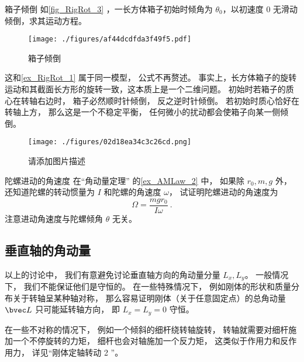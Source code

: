 \begin{example}{箱子倾倒}
如\autoref{fig_RigRot_3} ，一长方体箱子初始时倾角为 $\theta_0$，以初速度 0 无滑动倾倒，求其运动方程。
\begin{figure}[ht]
\centering
\texttt{[image: ./figures/af44dcdfda3f49f5.pdf]}
\caption{箱子倾倒} \label{fig_RigRot_3}
\end{figure}
这和\autoref{ex_RigRot_1} 属于同一模型， 公式不再赘述。 事实上，长方体箱子的旋转运动和其截面长方形的旋转一致，这本质上是一个二维问题。 初始时若箱子的质心在转轴右边时， 箱子必然顺时针倾倒， 反之逆时针倾倒。 若初始时质心恰好在转轴上方， 那么这是一个不稳定平衡， 任何微小的扰动都会使箱子向某一侧倾倒。
\end{example}

\begin{example}{}\label{ex_RigRot_2}
\begin{figure}[ht]
\centering
\texttt{[image: ./figures/02d18ea34c3c26cd.png]}
\caption{请添加图片描述} \label{fig_RigRot_4}
\end{figure}
\end{example}

\begin{exercise}{陀螺进动的角速度}\label{exe_RigRot_1}
在“角动量定理” 的\autoref{ex_AMLaw_2} 中， 如果除 $r_0, m, g$ 外， 还知道陀螺的转动惯量为 $I$ 和陀螺的角速度 $\omega$， 试证明陀螺进动的角速度为
\begin{equation}
\Omega = \frac{mgr_0}{I\omega}~.
\end{equation}
注意进动角速度与陀螺倾角 $\theta$ 无关。
\end{exercise}

\subsection{垂直轴的角动量}
以上的讨论中， 我们有意避免讨论垂直轴方向的角动量分量 $L_x, L_y$。 一般情况下， 我们不能保证他们是守恒的。 在一些特殊情况下， 例如刚体的形状和质量分布关于转轴呈某种轴对称， 那么容易证明刚体（关于任意固定点）的总角动量 $\bvec L$ 只可能延转轴方向， 即 $L_x = L_y = 0$ 守恒。 %

在一些不对称的情况下， 例如一个倾斜的细杆绕转轴旋转， %
转轴就需要对细杆施加一个不停旋转的力矩， 细杆也会对轴施加一个反力矩， 这类似于作用力和反作用力， 详见“刚体定轴转动 2 ”。

